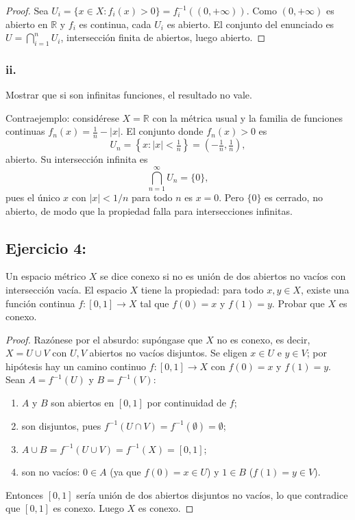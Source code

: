 \documentclass[11pt, a4paper]{article}
\begin{document}
\begin{proof}
Sea $U_i = \{ x \in X : f_i(x) > 0 \} = f_i^{-1}((0, +\infty))$. Como $(0, +\infty)$ es abierto en
$\mathbb{R}$ y $f_i$ es continua, cada $U_i$ es abierto. El conjunto del enunciado es
$U = \bigcap_{i=1}^n U_i$, intersección finita de abiertos, luego abierto.
\end{proof}

\subsubsection*{ii.}
Mostrar que si son infinitas funciones, el resultado no vale.

Contraejemplo: considérese $X = \mathbb{R}$ con la métrica usual y la familia de funciones continuas
$f_n(x) = \frac{1}{n} - |x|$. El conjunto donde $f_n(x) > 0$ es
$$ U_n = \left\{ x : |x| < \tfrac{1}{n} \right\} = \left(-\tfrac{1}{n}, \tfrac{1}{n}\right), $$
abierto. Su intersección infinita es
$$ \bigcap_{n=1}^\infty U_n = \{0\}, $$
pues el único $x$ con $|x| < 1/n$ para todo $n$ es $x = 0$. Pero $\{0\}$ es cerrado, no abierto, de modo
que la propiedad falla para intersecciones infinitas.

\subsection*{Ejercicio 4:}

Un espacio métrico $X$ se dice conexo si no es unión de dos abiertos no vacíos con intersección
vacía.
El espacio $X$ tiene la propiedad: para todo $x, y \in X$, existe una función continua
$f: [0,1] \to X$ tal que $f(0)=x$ y $f(1)=y$.
Probar que $X$ es conexo.

\begin{proof}
Razónese por el absurdo: supóngase que $X$ no es conexo, es decir, $X = U \cup V$ con $U, V$ abiertos
no vacíos disjuntos. Se eligen $x \in U$ e $y \in V$; por hipótesis hay un camino continuo
$f: [0,1] \to X$ con $f(0) = x$ y $f(1) = y$. Sean $A = f^{-1}(U)$ y $B = f^{-1}(V)$:
\begin{enumerate}
    \item $A$ y $B$ son abiertos en $[0,1]$ por continuidad de $f$;
    \item son disjuntos, pues $f^{-1}(U \cap V) = f^{-1}(\emptyset) = \emptyset$;
    \item $A \cup B = f^{-1}(U \cup V) = f^{-1}(X) = [0,1]$;
    \item son no vacíos: $0 \in A$ (ya que $f(0) = x \in U$) y $1 \in B$ ($f(1) = y \in V$).
\end{enumerate}
Entonces $[0,1]$ sería unión de dos abiertos disjuntos no vacíos, lo que contradice que $[0,1]$ es
conexo. Luego $X$ es conexo.
\end{proof}
\end{document}
